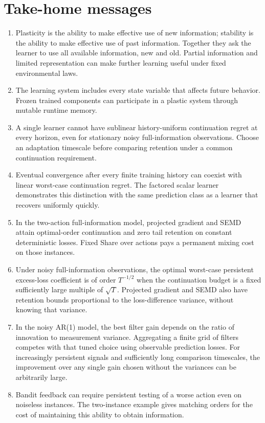 \documentclass[11pt,twoside]{article}
\theoremstyle{definition}
\theoremstyle{remark}
\begin{document}
\section{Take-home messages}
\begin{enumerate}[leftmargin=*]
\item Plasticity is the ability to make effective use of new information;
stability is the ability to make effective use of past information.
Together they ask the learner to use all available information, new and old.
Partial information and limited representation can make further learning
useful under fixed environmental laws.
\item The learning system includes every state variable that affects future
behavior. Frozen trained components can participate in a plastic system
through mutable runtime memory.
\item A single learner cannot have sublinear history-uniform continuation
regret at every horizon, even for stationary noisy full-information
observations. Choose an adaptation timescale before comparing retention
under a common continuation requirement.
\item Eventual convergence after every finite training history can coexist
with linear worst-case continuation regret. The factored scalar learner
demonstrates this distinction with the same prediction class as a learner
that recovers uniformly quickly.
\item In the two-action full-information model, projected gradient and
SEMD attain optimal-order continuation and zero tail retention on constant
deterministic losses. Fixed Share over actions pays a permanent mixing
cost on those instances.
\item Under noisy full-information observations, the optimal worst-case
persistent excess-loss coefficient is of order $T^{-1/2}$ when the
continuation budget is a fixed sufficiently large multiple of $\sqrt T$.
Projected gradient and SEMD also have retention bounds proportional to
the loss-difference variance, without knowing that variance.
\item In the noisy AR(1) model, the best filter gain depends on the ratio
of innovation to measurement variance. Aggregating a finite grid of filters
competes with that tuned choice using observable prediction losses. For
increasingly persistent signals and sufficiently long comparison timescales,
the improvement over any single gain chosen without the variances can be
arbitrarily large.
\item Bandit feedback can require persistent testing of a worse action
even on noiseless instances. The two-instance example gives matching
orders for the cost of maintaining this ability to obtain information.
\end{enumerate}
\end{document}
